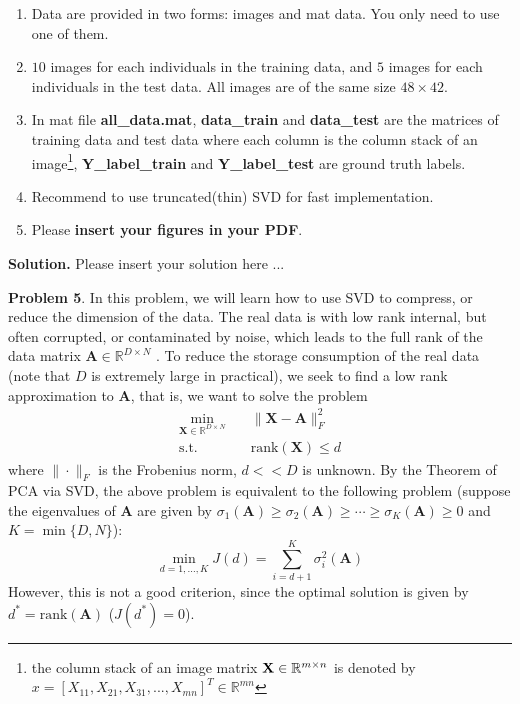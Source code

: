 \documentclass[english,onecolumn]{IEEEtran}
\newcommand{\Rbb}{\mathbb{R}}
\newcommand{\bX}{{\bf X}}
\begin{document}
\begin{enumerate}
    \item Data are provided in two forms: images and mat data. You only need to use one of them. 
    \item $10$ images for each individuals in the training data, and $5$ images for each individuals in the test data. All images are of the same size $48\times 42$.
    \item In mat file \textbf{all\_data.mat}, \textbf{data\_train} and \textbf{data\_test} are the matrices of training data and test data where each column is the column stack of an image\footnote{the column stack of an image matrix $\bX\in \Rbb^{m\times n}$ is denoted by $x = [X_{11},X_{21},X_{31},...,X_{mn}]^T\in\Rbb^{mn}$}, \textbf{Y\_label\_train} and \textbf{Y\_label\_test} are ground truth labels.
    \item Recommend to use truncated(thin) SVD for fast implementation.
    \item Please \textbf{insert your figures in your PDF}.
\end{enumerate}

\noindent
\textbf{Solution.}
Please insert your solution here ...


\clearpage
\newpage
\noindent\textbf{Problem 5}.
In this problem, we will learn how to use SVD to compress, or reduce the dimension of the data. The real data is with low rank internal, but often corrupted, or contaminated by noise, which leads to the full rank of the data matrix $\mathbf{A}\in\mathbb{R}^{D\times N}$ . To reduce the storage consumption of the real data (note that $D$ is extremely large in practical), we seek to find a low rank approximation to  $\mathbf{A}$, that is, we want to solve the problem
\begin{align}
    \min_{\mathbf{X}\in\mathbb{R}^{D\times N}}&\quad \|\mathbf{X}-\mathbf{A}\|_F^2\\
    \mathrm{s.t.}&\quad \mathrm{rank}(\mathbf{X})\leq d
\end{align}
where $\|\cdot\|_F$ is the Frobenius norm, $d<< D$ is unknown.
By the Theorem of PCA via SVD, the above problem is equivalent to the following problem (suppose the eigenvalues of $\mathbf{A}$ are given by $\sigma_1(\mathbf{A})\geq\sigma_2(\mathbf{A})\geq\cdots\geq \sigma_K(\mathbf{A})\geq0$ and $K=\min\{D,N\}$):
\begin{equation}
    \min_{d=1,\dots,K}J(d)=\sum_{i=d+1}^K\sigma_i^2(\mathbf{A})
\end{equation}
However, this is not a good criterion, since the optimal solution is given by $d^*=\mathrm{rank}(\mathbf{A})$ ($J(d^*)=0$).
\end{document}

